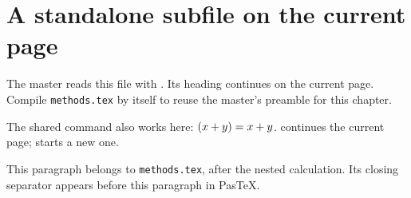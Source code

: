 \documentclass[main.tex]{subfiles}
\begin{document}
\section{A standalone subfile on the current page}
The master reads this file with \verb||. Its heading
continues on the current page. Compile \texttt{methods.tex} by itself to
reuse the master's preamble for this chapter.

The shared command also works here: $\left(x+y\right)=x+y$.
\verb|| continues the current page; \verb|| starts a new one.



This paragraph belongs to \texttt{methods.tex}, after the nested calculation.
Its closing separator appears before this paragraph in PasTeX.
\end{document}
